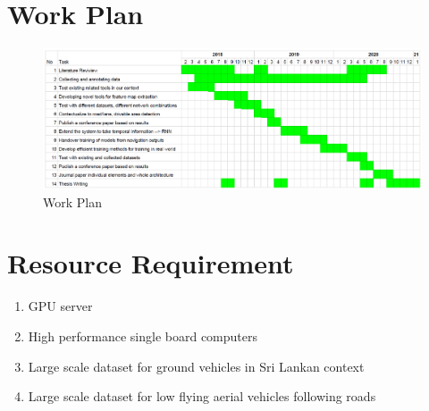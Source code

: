 \section{Work Plan}
\label{sec:workplan}

\begin{figure}[h]
	\includegraphics[width=\linewidth]{figures/timeline.png}
	\caption{Work Plan}
	\label{fig:workplan}
\end{figure}


\section{Resource Requirement}
\label{sec:resourcereq}

\begin{enumerate}
\item GPU server 
\item High performance single board computers
\item Large scale dataset for ground vehicles in Sri Lankan context
\item Large scale dataset for low flying aerial vehicles following roads

\end{enumerate}

